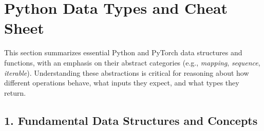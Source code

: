 \section{Python Data Types and Cheat Sheet}

This section summarizes essential Python and PyTorch data structures and functions, with an emphasis on their abstract categories (e.g., \textit{mapping}, \textit{sequence}, \textit{iterable}). Understanding these abstractions is critical for reasoning about how different operations behave, what inputs they expect, and what types they return.

\subsection*{1. Fundamental Data Structures and Concepts}

